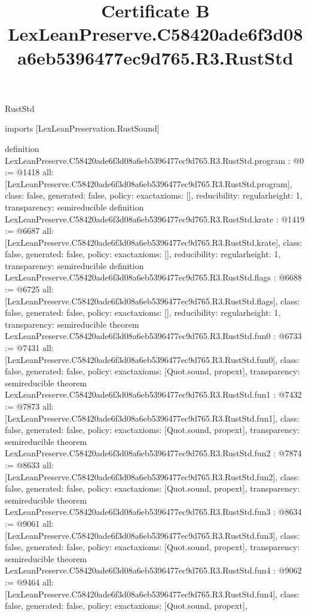 \begin{lexlean}{RustStd}
\title{Certificate B LexLeanPreserve.C58420ade6f3d08a6eb5396477ec9d765.R3.RustStd}
\begin{coremodule}
imports [LexLeanPreservation.RustSound]

definition LexLeanPreserve.C58420ade6f3d08a6eb5396477ec9d765.R3.RustStd.program : @0 := @1418 {
  all: [LexLeanPreserve.C58420ade6f3d08a6eb5396477ec9d765.R3.RustStd.program],
  class: false,
  generated: false,
  policy: exact{axioms: []},
  reducibility: regular{height: 1},
  transparency: semireducible
}
definition LexLeanPreserve.C58420ade6f3d08a6eb5396477ec9d765.R3.RustStd.krate : @1419 := @6687 {
  all: [LexLeanPreserve.C58420ade6f3d08a6eb5396477ec9d765.R3.RustStd.krate],
  class: false,
  generated: false,
  policy: exact{axioms: []},
  reducibility: regular{height: 1},
  transparency: semireducible
}
definition LexLeanPreserve.C58420ade6f3d08a6eb5396477ec9d765.R3.RustStd.flags : @6688 := @6725 {
  all: [LexLeanPreserve.C58420ade6f3d08a6eb5396477ec9d765.R3.RustStd.flags],
  class: false,
  generated: false,
  policy: exact{axioms: []},
  reducibility: regular{height: 1},
  transparency: semireducible
}
theorem LexLeanPreserve.C58420ade6f3d08a6eb5396477ec9d765.R3.RustStd.fun0 : @6733 := @7431 {
  all: [LexLeanPreserve.C58420ade6f3d08a6eb5396477ec9d765.R3.RustStd.fun0],
  class: false,
  generated: false,
  policy: exact{axioms: [Quot.sound, propext]},
  transparency: semireducible
}
theorem LexLeanPreserve.C58420ade6f3d08a6eb5396477ec9d765.R3.RustStd.fun1 : @7432 := @7873 {
  all: [LexLeanPreserve.C58420ade6f3d08a6eb5396477ec9d765.R3.RustStd.fun1],
  class: false,
  generated: false,
  policy: exact{axioms: [Quot.sound, propext]},
  transparency: semireducible
}
theorem LexLeanPreserve.C58420ade6f3d08a6eb5396477ec9d765.R3.RustStd.fun2 : @7874 := @8633 {
  all: [LexLeanPreserve.C58420ade6f3d08a6eb5396477ec9d765.R3.RustStd.fun2],
  class: false,
  generated: false,
  policy: exact{axioms: [Quot.sound, propext]},
  transparency: semireducible
}
theorem LexLeanPreserve.C58420ade6f3d08a6eb5396477ec9d765.R3.RustStd.fun3 : @8634 := @9061 {
  all: [LexLeanPreserve.C58420ade6f3d08a6eb5396477ec9d765.R3.RustStd.fun3],
  class: false,
  generated: false,
  policy: exact{axioms: [Quot.sound, propext]},
  transparency: semireducible
}
theorem LexLeanPreserve.C58420ade6f3d08a6eb5396477ec9d765.R3.RustStd.fun4 : @9062 := @9464 {
  all: [LexLeanPreserve.C58420ade6f3d08a6eb5396477ec9d765.R3.RustStd.fun4],
  class: false,
  generated: false,
  policy: exact{axioms: [Quot.sound, propext]},
}
\end{coremodule}
\end{lexlean}
